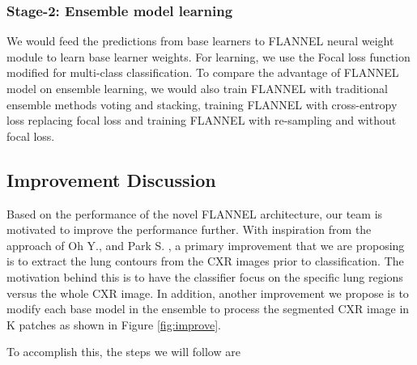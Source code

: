 \documentclass{sigkddExp}
\begin{document}
\subsubsection{Stage-2: Ensemble model learning}
We would feed the predictions from base learners to FLANNEL neural weight module
to learn base learner weights. For learning, we use the Focal loss function
modified for multi-class classification. To compare the advantage of FLANNEL
model on ensemble learning, we would also train FLANNEL with traditional
ensemble methods voting and stacking, training FLANNEL with cross-entropy loss
replacing focal loss and training FLANNEL with re-sampling and without focal
loss.

\subsection{Improvement Discussion}

Based on the performance of the novel FLANNEL architecture, our team is
motivated to improve the performance further. With inspiration from the approach
of Oh Y., and Park S. \cite{pmid32396075}, a primary improvement that we are
proposing is to extract the lung contours from the CXR images prior to
classification. The motivation behind this is to have the classifier focus on
the specific lung regions versus the whole CXR image. In addition, another
improvement we propose is to modify each base model in the ensemble to process
the segmented CXR image in K patches as shown in Figure \ref{fig:improve}.

To accomplish this, the steps we will follow are
\end{document}
